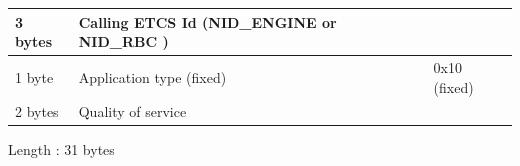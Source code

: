\documentclass[nocc]{template/openetcs_report}
\begin{document}
\begin{longtable}{|l|l|l|}
				\hline
					\begin{minipage}[t]{0.1\linewidth}3 bytes \end{minipage}
					&\begin{minipage}[t]{0.6\linewidth} Calling ETCS Id (NID\_ENGINE or NID\_RBC )	\end{minipage}
					&\begin{minipage}[t]{0.3\linewidth} \end{minipage} \\
				
				\hline
					\begin{minipage}[t]{0.1\linewidth}1 byte \end{minipage}
					&\begin{minipage}[t]{0.6\linewidth} Application type (fixed)	\end{minipage}
					&\begin{minipage}[t]{0.3\linewidth}0x10 (fixed) \end{minipage} \\
				
				\hline
					\begin{minipage}[t]{0.1\linewidth}2 bytes \end{minipage}
					&\begin{minipage}[t]{0.6\linewidth} Quality of service	\end{minipage}
					&\begin{minipage}[t]{0.3\linewidth} \end{minipage} \\
				
				\hline
			\end{longtable}
			Length : 31 bytes
\end{document}
